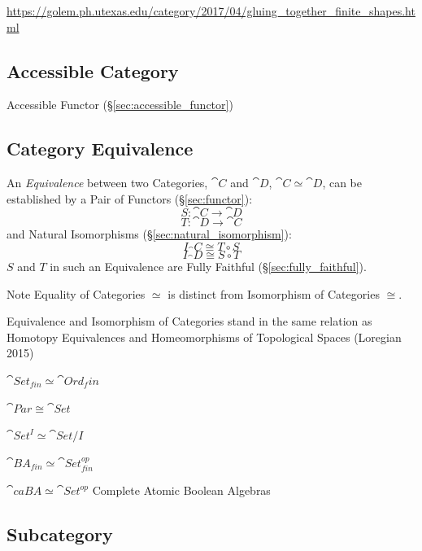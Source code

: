 \url{https://golem.ph.utexas.edu/category/2017/04/gluing_together_finite_shapes.html}



\subsection{Accessible Category}\label{sec:accessible_category}

Accessible Functor (\S\ref{sec:accessible_functor})



\subsection{Category Equivalence}\label{sec:category_equivalence}

An \emph{Equivalence} between two Categories, $\cat{C}$ and $\cat{D}$,
$\cat{C} \simeq \cat{D}$, can be established by a Pair of Functors
(\S\ref{sec:functor}):
\[
  S : \cat{C} \rightarrow \cat{D}
\]\[
  T : \cat{D} \rightarrow \cat{C}
\]
and Natural Isomorphisms (\S\ref{sec:natural_isomorphism}):
\[
  I_\cat{C} \cong T \circ S
\]\[
  I_\cat{D} \cong S \circ T
\]
$S$ and $T$ in such an Equivalence are Fully Faithful
(\S\ref{sec:fully_faithful}).

\fist Note Equality of Categories $\simeq$ is distinct from Isomorphism of
Categories $\cong$.

Equivalence and Isomorphism of Categories stand in the same relation as Homotopy
Equivalences and Homeomorphisms of Topological Spaces (Loregian 2015)

$\cat{Set}_{fin} \simeq \cat{Ord}_fin$

$\cat{Par} \cong \cat{Set}$

$\cat{Set}^I \simeq \cat{Set}/I$

$\cat{BA}_{fin} \simeq \cat{Set}_{fin}^{op}$

$\cat{caBA} \simeq \cat{Set}^{op}$ Complete Atomic Boolean
Algebras %



\subsection{Subcategory}\label{sec:subcategory}

